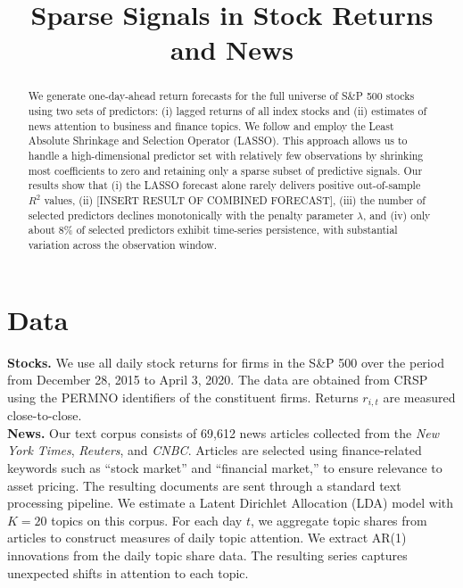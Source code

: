 \documentclass[10pt,twocolumn]{article}
\title{\vspace{-6pt}\textbf{Sparse Signals in Stock Returns and News}\vspace{-4pt}}
\date{}
\begin{document}
\maketitle
\vspace{-18pt}

\begin{abstract}
\noindent
We generate one-day-ahead return forecasts for the full universe of S\&P 500 stocks using two sets of predictors: (i) lagged returns of all index stocks and (ii) estimates of news attention to business and finance topics. We follow \cite{chinco2019sparse} and employ the Least Absolute Shrinkage and Selection Operator (LASSO). This approach allows us to handle a high-dimensional predictor set with relatively few observations by shrinking most coefficients to zero and retaining only a sparse subset of predictive signals. Our results show that (i) the LASSO forecast alone rarely delivers positive out-of-sample $R^2$ values, (ii) [INSERT RESULT OF COMBINED FORECAST], (iii) the number of selected predictors declines monotonically with the penalty parameter $\lambda$, and (iv) only about 8\% of selected predictors exhibit time-series persistence, with substantial variation across the observation window.
\end{abstract}

\section{Data}
\label{sec:data}

\textbf{Stocks.} We use all daily stock returns for firms in the S\&P 500 over the period from December 28, 2015 to April 3, 2020. The data are obtained from CRSP using the PERMNO identifiers of the constituent firms. Returns $r_{i,t}$ are measured close-to-close.\\
\textbf{News.} Our text corpus consists of 69{,}612 news articles collected from the \emph{New York Times}, \textit{Reuters}, and \textit{CNBC}. Articles are selected using finance-related keywords such as ``stock market'' and ``financial market,'' to ensure relevance to asset pricing. The resulting documents are sent through a standard text processing pipeline. We estimate a Latent Dirichlet Allocation (LDA) model with $K=20$ topics on this corpus. For each day $t$, we aggregate topic shares from articles to construct measures of daily topic attention. We extract AR(1) innovations from the daily topic share data. The resulting series captures unexpected shifts in attention to each topic.
\end{document}
